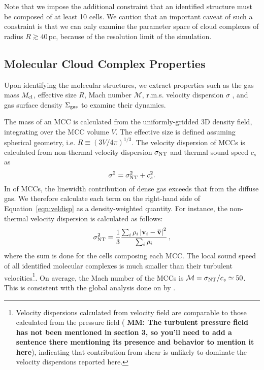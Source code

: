 \IfFileExists{emulateapjlegacy.cls}{\documentclass[iop]{emulateapjlegacy}}{\documentclass[iop]{emulateapj}}
\newcommand{\MM}[1]{({\bf \color{mmcolor} MM: #1})}
\begin{document}
Note that we impose the additional constraint that an identified
structure must be composed of at least 10 cells. We caution that an
important caveat of such a constraint is that we can only examine the
parameter space of cloud complexes of 
   radius $R\gtrsim 40$\,pc,
because of the resolution limit of the simulation.

\subsection{Molecular Cloud 
    Complex
Properties}

Upon identifying the molecular structures, we extract properties such
as the gas mass $M_{\rm cl}$, effective size $R$, Mach number
$\mathcal{M}$, r.m.s. velocity dispersion $\sigma$
, and gas surface density $\Sigma_{\rm gas}$ to examine their dynamics.

The mass of an MCC is calculated from the uniformly-gridded 3D density field, integrating over the MCC volume $V$. The effective size is defined assuming spherical geometry, i.e. $R \equiv (3 V /4 \pi)^{1/3}$.
%
The velocity dispersion of MCCs is calculated from non-thermal
velocity dispersion $\sigma_{\rm NT}$ and thermal sound speed $c_s$ as
\begin{equation}
\sigma^2 = \sigma_{\rm NT}^2 + c_s^2.
\label{eqn:veldisp}
\end{equation}
%
In \obs of MCCs, the linewidth contribution of dense gas 
exceeds that from the diffuse gas. We therefore calculate each term on
the right-hand side of Equation~\ref{eqn:veldisp} as a density-weighted quantity. For instance, the non-thermal velocity dispersion is calculated as follows:
\begin{equation}
\sigma_{\rm NT}^2 = \frac{1}{{3}}\frac{\sum_{i} \rho_i \left|\mathbf{v}_i - \mathbf{\bar v}\right|^2}{\sum_i \rho_i}\,,
\end{equation}
where the sum is done for the cells composing each MCC.
%
The local sound speed of all identified molecular complexes is much
smaller than their turbulent velocities\footnote{Velocity dispersions
  calculated from velocity field are comparable to those calculated
  from the pressure field 
    \MM{The turbulent pressure field has not been
    mentioned in section 3, so you'll need to add a sentence there
    mentioning its presence and behavior to mention it here}, 
indicating that contribution from shear is unlikely to dominate the velocity dispersions reported here.\label{ftn:veldisp}}. On average, the Mach number of the MCCs is  $\mathcal{M} = \sigma_{\rm NT}/c_s\simeq 50$. This is consistent with the global analysis done on \flower by \citet{Vallini18a}.
\end{document}

